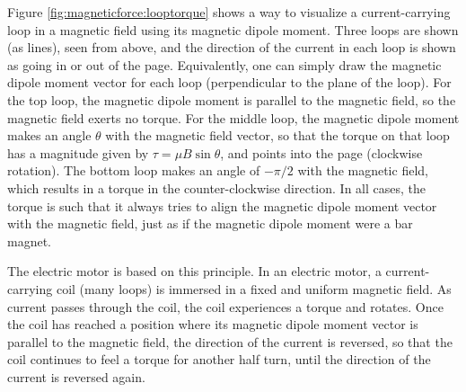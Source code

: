 Figure \ref{fig:magneticforce:looptorque} shows a way to visualize a current-carrying loop in a magnetic field using its magnetic dipole moment.  
Three loops are shown (as lines), seen from above, and the direction of the current in each loop is shown as going in or out of the page. Equivalently, one can simply draw the magnetic dipole moment vector for each loop (perpendicular to the plane of the loop). For the top loop, the magnetic dipole moment is parallel to the magnetic field, so the magnetic field exerts no torque. For the middle loop, the magnetic dipole moment makes an angle $\theta$ with the magnetic field vector, so that the torque on that loop has a magnitude given by $\tau=\mu B \sin\theta$, and points into the page (clockwise rotation). The bottom loop makes an angle of $-\pi/2$ with the magnetic field, which results in a torque in the counter-clockwise direction. In all cases, the torque is such that it always tries to align the magnetic dipole moment vector with the magnetic field, just as if the magnetic dipole moment were a bar magnet.

The electric motor is based on this principle. In an electric motor, a current-carrying coil (many loops) is immersed in a fixed and uniform magnetic field. As current passes through the coil, the coil experiences a torque and rotates. Once the coil has reached a position where its magnetic dipole moment vector is parallel to the magnetic field, the direction of the current is reversed, so that the coil continues to feel a torque for another half turn, until the direction of the current is reversed again. 


